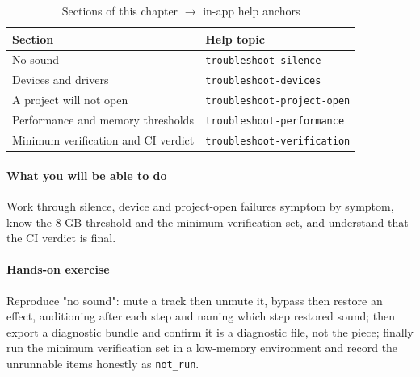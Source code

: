\begin{table}[htbp]
\centering
\caption{Sections of this chapter $\to$ in-app help anchors}
\label{tab:ch11-help}
\begin{tabular}{ll}
\hline
Section & Help topic \\
\hline
No sound & \texttt{troubleshoot-silence} \\
Devices and drivers & \texttt{troubleshoot-devices} \\
A project will not open & \texttt{troubleshoot-project-open} \\
Performance and memory thresholds & \texttt{troubleshoot-performance} \\
Minimum verification and CI verdict & \texttt{troubleshoot-verification} \\
\hline
\end{tabular}
\end{table}

\paragraph{What you will be able to do} Work through silence, device and project-open failures symptom by symptom, know the 8 GB threshold and the minimum verification set, and understand that the CI verdict is final.

\paragraph{Hands-on exercise} Reproduce "no sound": mute a track then unmute it, bypass then restore an effect, auditioning after each step and naming which step restored sound; then export a diagnostic bundle and confirm it is a diagnostic file, not the piece; finally run the minimum verification set in a low-memory environment and record the unrunnable items honestly as \texttt{not\_run}.
